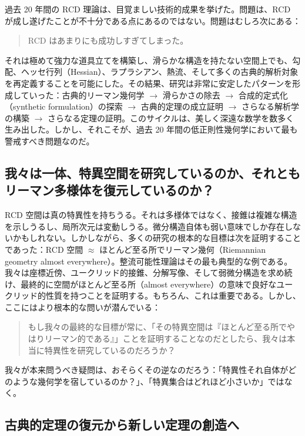 \documentclass[lualatex]{ltjsarticle}
\begin{document}
過去 20 年間の RCD 理論は、目覚ましい技術的成果を挙げた。問題は、RCD が成し遂げたことが不十分である点にあるのではない。問題はむしろ次にある：

\begin{quote}
RCD はあまりにも成功しすぎてしまった。
\end{quote}

それは極めて強力な道具立てを構築し、滑らかな構造を持たない空間上でも、勾配、ヘッセ行列（Hessian）、ラプラシアン、熱流、そして多くの古典的解析対象を再定義することを可能にした。その結果、研究は非常に安定したパターンを形成していった：古典的リーマン幾何学 $\longrightarrow$ 滑らかさの除去 $\longrightarrow$ 合成的定式化（synthetic formulation）の探索 $\longrightarrow$ 古典的定理の成立証明 $\longrightarrow$ さらなる解析学の構築 $\longrightarrow$ さらなる定理の証明。このサイクルは、美しく深遠な数学を数多く生み出した。しかし、それこそが、過去 20 年間の低正則性幾何学において最も警戒すべき問題なのだ。

\subsection{我々は一体、特異空間を研究しているのか、それともリーマン多様体を復元しているのか？}

RCD 空間は真の特異性を持ちうる。それは多様体ではなく、接錐は複雑な構造を示しうるし、局所次元は変動しうる。微分構造自体も弱い意味でしか存在しないかもしれない。しかしながら、多くの研究の根本的な目標は次を証明することであった：RCD 空間 $\approx$ ほとんど至る所でリーマン幾何（Riemannian geometry almost everywhere）。整流可能性理論はその最も典型的な例である。我々は座標近傍、ユークリッド的接錐、分解写像、そして弱微分構造を求め続け、最終的に空間がほとんど至る所（almost everywhere）の意味で良好なユークリッド的性質を持つことを証明する。もちろん、これは重要である。しかし、ここにはより根本的な問いが潜んでいる：

\begin{quote}
もし我々の最終的な目標が常に、「その特異空間は『ほとんど至る所でやはりリーマン的である』」ことを証明することなのだとしたら、我々は本当に特異性を研究しているのだろうか？
\end{quote}

我々が本来問うべき疑問は、おそらくその逆なのだろう：「特異性それ自体がどのような幾何学を宿しているのか？」、「特異集合はどれほど小さいか」ではなく。

\subsection{古典的定理の復元から新しい定理の創造へ}
\end{document}
